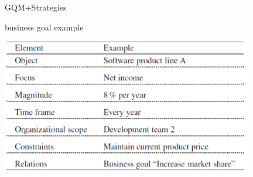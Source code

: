 \documentclass{beamer}
\begin{document}
\begin{frame}{\centerline{GQM+Strategies}}

\begin{center}
business goal example

\includegraphics[width=110mm]{A2022.IDSEPC.SperimentazioneDeduzione/image-06.png}
\end{center}

\end{frame}
\end{document}
